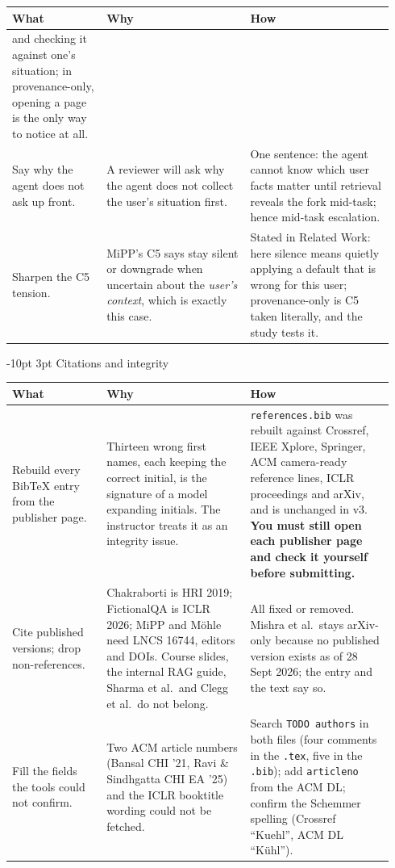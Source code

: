 \documentclass[9pt,letterpaper]{extarticle}
\makeatletter
\newcommand{\rowsep}{\noalign{\vskip 1.5pt}\arrayrulecolor{black!35}\hline\arrayrulecolor{black}\noalign{\vskip 1.5pt}}
\renewcommand\section{\@startsection{section}{1}{\z@}%
  {-10pt \@plus -2pt \@minus -1pt}{3pt}%
  {\sffamily\bfseries\large\color{accent}}}
\let\oldsection\section
\renewcommand{\section}{\needspace{7\baselineskip}\oldsection}
\newcommand{\wwh}{\toprule
\sffamily\bfseries\color{accent} What & \sffamily\bfseries\color{accent} Why & \sffamily\bfseries\color{accent} How \\
\midrule}
\newenvironment{wwhtable}{\footnotesize
\begin{longtable}{@{}>{\raggedright\arraybackslash}p{0.23\linewidth}>{\raggedright\arraybackslash}p{0.355\linewidth}>{\raggedright\arraybackslash}p{0.355\linewidth}@{}}
\wwh}{\bottomrule\end{longtable}}
\makeatother
\begin{document}
\begin{wwhtable}
and checking it against one's situation; in provenance-only, opening a page is
the only way to notice at all. \\
\rowsep
Say why the agent does not ask up front. &
A reviewer will ask why the agent does not collect the user's situation
first. &
One sentence: the agent cannot know which user facts matter until retrieval
reveals the fork mid-task; hence mid-task escalation. \\
\rowsep
Sharpen the C5 tension. &
MiPP's C5 says stay silent or downgrade when uncertain about the
\emph{user's context}, which is exactly this case. &
Stated in Related Work: here silence means quietly applying a default that is
wrong for this user; provenance-only is C5 taken literally, and the study
tests it. \\
\end{wwhtable}

\section{Citations and integrity}
\begin{wwhtable}
Rebuild every BibTeX entry from the publisher page. &
Thirteen wrong first names, each keeping the correct initial, is the
signature of a model expanding initials. The instructor treats it as an
integrity issue. &
\texttt{references.bib} was rebuilt against Crossref, IEEE Xplore, Springer,
ACM camera-ready reference lines, ICLR proceedings and arXiv, and is unchanged
in v3. \textbf{You must still open each publisher page and check it yourself
before submitting.} \\
\rowsep
Cite published versions; drop non-references. &
Chakraborti is HRI 2019; FictionalQA is ICLR 2026; MiPP and M\"ohle need LNCS
16744, editors and DOIs. Course slides, the internal RAG guide, Sharma et al.\
and Clegg et al.\ do not belong. &
All fixed or removed. Mishra et al.\ stays arXiv-only because no published
version exists as of 28 Sept 2026; the entry and the text say so. \\
\rowsep
Fill the fields the tools could not confirm. &
Two ACM article numbers (Bansal CHI '21, Ravi \& Sindhgatta CHI EA '25) and
the ICLR booktitle wording could not be fetched. &
Search \texttt{TODO authors} in both files (four comments in the
\texttt{.tex}, five in the \texttt{.bib}); add \texttt{articleno} from the
ACM DL; confirm the Schemmer spelling (Crossref ``Kuehl'', ACM DL
``K\"uhl''). \\
\end{wwhtable}
\end{document}

